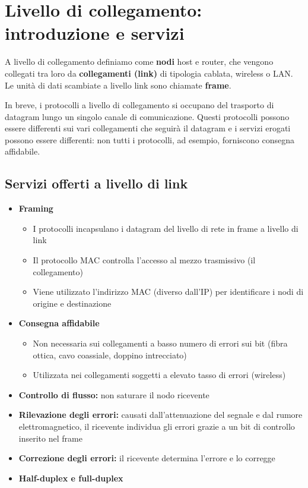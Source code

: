 \documentclass[
]{article}
\author{}
\date{}
\begin{document}
\hypertarget{header-n0}{%
\section{Livello di collegamento: introduzione e
servizi}\label{header-n0}}

A livello di collegamento definiamo come \textbf{nodi} host e router,
che vengono collegati tra loro da \textbf{collegamenti (link)} di
tipologia cablata, wireless o LAN. Le unità di dati scambiate a livello
link sono chiamate \textbf{frame}.

In breve, i protocolli a livello di collegamento si occupano del
trasporto di datagram lungo un singolo canale di comunicazione. Questi
protocolli possono essere differenti sui vari collegamenti che seguirà
il datagram e i servizi erogati possono essere differenti: non tutti i
protocolli, ad esempio, forniscono consegna affidabile.

\hypertarget{header-n4}{%
\subsection{Servizi offerti a livello di link}\label{header-n4}}

\begin{itemize}
\item
  \textbf{Framing}

  \begin{itemize}
  \item
    I protocolli incapsulano i datagram del livello di rete in frame a
    livello di link
  \item
    Il protocollo MAC controlla l'accesso al mezzo trasmissivo (il
    collegamento)
  \item
    Viene utilizzato l'indirizzo MAC (diverso dall'IP) per identificare
    i nodi di origine e destinazione
  \end{itemize}
\item
  \textbf{Consegna affidabile}

  \begin{itemize}
  \item
    Non necessaria sui collegamenti a basso numero di errori sui bit
    (fibra ottica, cavo coassiale, doppino intrecciato)
  \item
    Utilizzata nei collegamenti soggetti a elevato tasso di errori
    (wireless)
  \end{itemize}
\item
  \textbf{Controllo di flusso:} non saturare il nodo ricevente
\item
  \textbf{Rilevazione degli errori:} causati dall'attenuazione del
  segnale e dal rumore elettromagnetico, il ricevente individua gli
  errori grazie a un bit di controllo inserito nel frame
\item
  \textbf{Correzione degli errori:} il ricevente determina l'errore e lo
  corregge
\item
  \textbf{Half-duplex e full-duplex}
\end{itemize}
\end{document}
